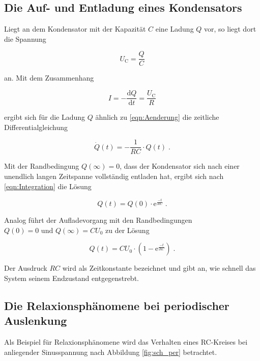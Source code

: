 \subsection{Die Auf- und Entladung eines Kondensators}

Liegt an dem Kondensator mit der Kapazität $C$ eine Ladung $Q$ vor, so liegt dort die Spannung 

\begin{equation*}
    U_\text{C} = \frac{Q}{C}
\end{equation*}

an. Mit dem Zusammenhang

\begin{equation*}
    I = - \frac{\text{d}Q}{\text{d}t} = \frac{U_\text{C}}{R}
\end{equation*}

ergibt sich für die Ladung $Q$ ähnlich zu \eqref{eqn:Aenderung}
 die zeitliche Differentialgleichung

\begin{equation}
    \dot{Q}(t) = - \frac{1}{RC} \cdot Q(t) \; \text{.}
\end{equation}

Mit der Randbedingung $Q(\infty) = 0$, dass der Kondensator sich nach einer unendlich langen Zeitspanne
vollständig entladen hat, ergibt sich nach \eqref{eqn:Integration} die Lösung

\begin{equation}
    Q(t) = Q(0) \cdot \text{e}^{\frac{-t}{RC}} \; \text{.}
    \label{eqn:ent}
\end{equation}

Analog führt der Aufladevorgang mit den Randbedingungen $Q(0) = 0 \text{  und  } Q(\infty) = CU_0$
zu der Lösung

\begin{equation}
    Q(t) = CU_0 \cdot \left(1 - \text{e}^{\frac{-t}{RC}}\right) \; \text{.}
\end{equation}

Der Ausdruck $RC$ wird als Zeitkonstante bezeichnet und gibt an, wie schnell das System seinem 
Endzustand entgegenstrebt.

\subsection{Die Relaxionsphänomene bei periodischer Auslenkung}

Als Beispiel für Relaxionsphänomene wird das Verhalten eines RC-Kreises bei anliegender
Sinusspannung nach Abbildung \ref{fig:sch_per} betrachtet. 

